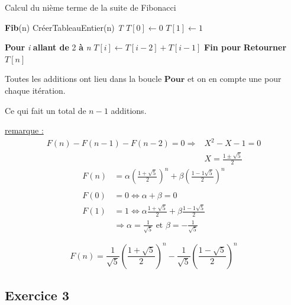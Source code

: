 \documentclass{article}[12pt]
\newcommand*{\pour}{\textbf{Pour }}
\newcommand*{\finpour}{\textbf{Fin pour }}
\newcommand*{\allant}{\textbf{ allant de }}
\newcommand*{\jusqua}{\textbf{ à }}
\newcommand*{\res}{\textbf{Retourner }}
\begin{document}
\begin{algorithm}
\caption{Calcul du nième terme de la suite de Fibonacci}
\begin{algorithmic}[1]
\State\textbf{Fib}(n)
\State \qquad CréerTableauEntier(n) \textit{T}
\State \qquad $\textit{T}[0] \gets 0$
\State \qquad $\textit{T}[1] \gets 1$

\State \qquad \pour \textit{i} \allant2\jusqua \textit{n}
\State \qquad \qquad $\textit{T}[i] \gets \textit{T}[i-2] + \textit{T}[i-1]$
\State \qquad \finpour
\State \qquad \res$\textit{T}[n]$
\end{algorithmic}
\end{algorithm}

Toutes les additions ont lieu dans la boucle $\pour$et on en compte une pour chaque itération. \begin{center}
    \begin{tcolorbox}[text width = 7cm]
        Ce qui fait un total de $n-1$ additions.
    \end{tcolorbox}
\end{center}

\underline{remarque :}
\begin{align*}
    F(n) - F(n-1) - F(n-2) = 0 \Rightarrow &X^2 - X - 1 = 0\\
    & X = \frac{1 \pm \sqrt{5}}{2}
\end{align*}
\begin{align*}
    F(n) &= \alpha \left(\frac{1 + \sqrt{5}}{2}\right)^n + \beta \left(\frac{1 -1 \sqrt{5}}{2}\right)^n\\\\
    F(0) &= 0 \Leftrightarrow \alpha + \beta = 0\\
    F(1) &= 1 \Leftrightarrow \alpha \frac{1 + \sqrt{5}}{2} + \beta \frac{1 -1 \sqrt{5}}{2}\\
    &\Rightarrow \alpha = \frac{1}{\sqrt{5}} \text{ et } \beta = -\frac{1}{\sqrt{5}}
\end{align*}
\begin{center}
    \begin{tcolorbox}[text width = 9.5cm]
        \[F(n) = \frac{1}{\sqrt{5}}\left(\frac{1 + \sqrt{5}}{2}\right)^n - \frac{1}{\sqrt{5}}\left(\frac{1 - \sqrt{5}}{2}\right)^n\]
    \end{tcolorbox}
\end{center}

\subsection*{Exercice 3}
\end{document}
